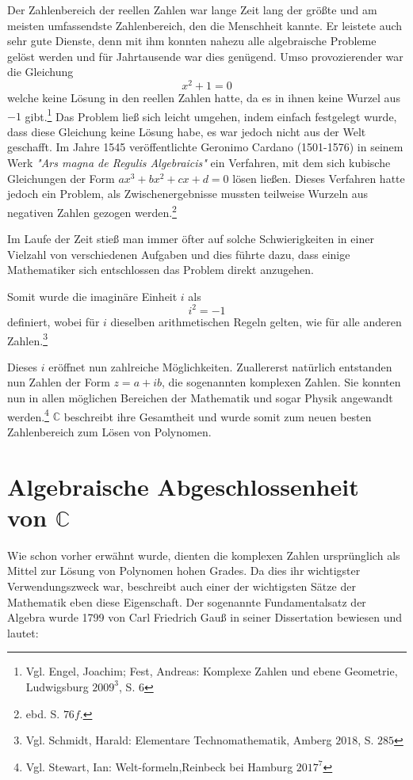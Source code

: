 \documentclass[a4paper,12pt]{article} %
\begin{document}
Der Zahlenbereich der reellen Zahlen war lange Zeit lang der größte und am meisten umfassendste Zahlenbereich, den die Menschheit kannte.
Er leistete auch sehr gute Dienste, denn mit ihm konnten nahezu alle algebraische Probleme gelöst werden und für Jahrtausende war dies genügend.
Umso provozierender war die Gleichung 
\[x^2+1=0\]
welche keine Lösung in den reellen Zahlen hatte, da es in ihnen keine Wurzel aus $-1$ gibt.\footnote{Vgl. Engel, Joachim; Fest, Andreas: Komplexe Zahlen und ebene Geometrie, Ludwigsburg $2009^3$, S. $6$}
Das Problem ließ sich leicht umgehen, indem einfach festgelegt wurde, dass diese Gleichung keine Lösung habe, es war jedoch nicht aus der Welt geschafft.
Im Jahre 1545 veröffentlichte Geronimo Cardano (1501-1576) in seinem Werk \emph{"{Ars} magna de Regulis Algebraicis"} ein Verfahren, mit dem sich kubische Gleichungen der Form $ax^3+bx^2+cx+d=0$ lösen ließen.
Dieses Verfahren hatte jedoch ein Problem, als Zwischenergebnisse mussten teilweise Wurzeln aus negativen Zahlen gezogen werden.\footnote{ebd. S. $76 f.$} 

Im Laufe der Zeit stieß man immer öfter auf solche Schwierigkeiten in einer Vielzahl von verschiedenen Aufgaben und dies führte dazu, dass einige Mathematiker sich entschlossen das Problem direkt anzugehen.

Somit wurde die imaginäre Einheit $i$ als
\[i^2=-1\]
definiert, wobei für $i$ dieselben arithmetischen Regeln gelten, wie für alle anderen Zahlen.\footnote{Vgl. Schmidt, Harald: Elementare Technomathematik, Amberg $2018$, S. $285$}


Dieses $i$ eröffnet nun zahlreiche Möglichkeiten.
Zuallererst natürlich entstanden nun Zahlen der Form $z=a+ib$, die sogenannten komplexen Zahlen.
Sie konnten nun in allen möglichen Bereichen der Mathematik und sogar Physik angewandt werden.\footnote{Vgl. Stewart, Ian: Welt-formeln,Reinbeck bei Hamburg  $2017^7$}
$\mathbb{C}$ beschreibt ihre Gesamtheit und wurde somit zum neuen besten Zahlenbereich zum Lösen von Polynomen.


\section{Algebraische Abgeschlossenheit von $\mathbb{C}$}

Wie schon vorher erwähnt wurde, dienten die komplexen Zahlen ursprünglich als Mittel zur Lösung von Polynomen hohen Grades.
Da dies ihr wichtigster Verwendungszweck war, beschreibt auch einer der wichtigsten Sätze der Mathematik eben diese Eigenschaft.
Der sogenannte Fundamentalsatz der Algebra wurde 1799 von Carl Friedrich Gauß in seiner Dissertation bewiesen und lautet:\\
\end{document}
